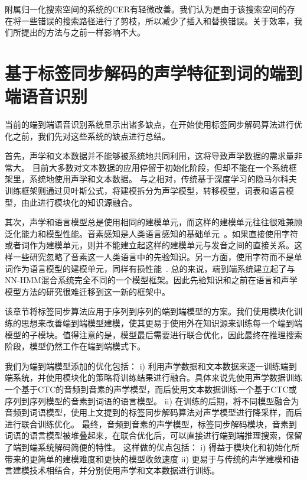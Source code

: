     附属归一化搜索空间的系统的CER有轻微改善。我们认为是由于该搜索空间的存在将一些错误的搜索路径进行了剪枝，所以减少了插入和替换错误。关于效率，我们所提出的方法与之前一样影响不大。



\section{基于标签同步解码的声学特征到词的端到端语音识别}
\label{chap:lsd-e2e}

当前的端到端语音识别系统显示出诸多缺点，在开始使用标签同步解码算法进行优化之前，我们先对这些系统的缺点进行总结。

首先，声学和文本数据并不能够被系统地共同利用，这将导致声学数据的需求量非常大。
目前大多数对文本数据的应用停留于初始化阶段，但却不能在一个系统框架里，系统地使用声学和文本数据。
与之相对，传统基于深度学习的隐马尔科夫训练框架则通过贝叶斯公式，将建模拆分为声学模型，转移模型，词表和语言模型，由此进行模块化的知识源融合。

其次，声学和语言模型总是使用相同的建模单元，而这样的建模单元往往很难兼顾泛化能力和模型性能。音素感知是人类语言感知的基础单元~\cite{pisoni1985speech}。如果直接使用字符或者词作为建模单元，则并不能建立起这样的建模单元与发音之间的直接关系。这样一些研究忽略了音素这一人类语言中的先验知识。另一方面，使用字符而不是单词作为语言模型的建模单元，同样有损性能~\cite{jozefowicz2016exploring}.
%
总的来说，端到端系统建立起了与NN-HMM混合系统完全不同的一个模型框架。因此先验知识和之前在语言和声学模型方法的研究很难迁移到这一新的框架中。

该章节将标签同步算法应用于序列到序列的端到端模型的方案。我们使用模块化训练的思想来改善端到端模型建模，使其更易于使用外在知识源来训练每一个端到端模型的子模块。值得注意的是，模型最后需要进行联合优化，因此最终在推理搜索阶段，模型仍然工作在端到端模式下。

我们为端到端模型添加的优化包括：
i) 利用声学数据和文本数据来逐一训练端到端系统，并使用模块化的策略将训练结果进行融合。具体来说先使用声学数据训练一个基于CTC的音频到音素的声学模型，而后使用文本数据训练一个基于CTC或序列到序列模型的音素到词语的语言模型。
ii) 在训练的后期，将不同模型融合为音频到词语模型，使用上文提到的标签同步解码算法对声学模型进行降采样，而后进行联合训练优化。
最终，音频到音素的声学模型，标签同步解码模块，音素到词语的语言模型被堆叠起来，在联合优化后，可以直接进行端到端推理搜索，保留了端到端系统解码简便的特性。
%
这样做的优点包括： i) 得益于模块化和初始化所带来的更简单的建模难度和更快的模型收敛速度 ii) 更易于与传统的声学建模和语言建模技术相结合，并分别使用声学和文本数据进行训练。


